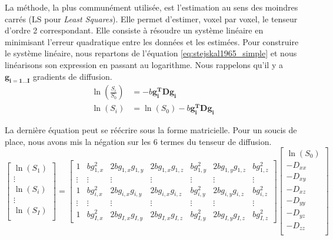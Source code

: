 La méthode, la plus communément utilisée, est l'estimation au sens des moindres carrés (LS pour \textit{Least Squares}).
Elle permet d'estimer, voxel par voxel, le tenseur d'ordre 2 correspondant.
Elle consiste à résoudre un système linéaire en minimisant l'erreur quadratique entre les données et les estimées.
Pour construire le système linéaire, nous repartons de l'équation \eqref{eq:stejskal1965_simple} 
et nous linéarisons son expression en passant au logarithme.
Nous rappelons qu'il y a $\mathbf{g_{i=1\dots I}}$ gradients de diffusion.
\begin{align}
    \ln \left(\frac{S_i}{S_0}\right) &= -b \mathbf{g_i^T}\mathbf{D}\mathbf{g_i} \nonumber \\
    \ln \left(S_i\right) &= \ln \left(S_0\right) - b \mathbf{g_i^T}\mathbf{D}\mathbf{g_i} \nonumber
\end{align}

La dernière équation peut se réécrire sous la forme matricielle.
Pour un soucis de place, nous avons mis la négation sur les 6 termes du tenseur de diffusion.
\begin{equation}
    \left[\begin{array}{c}
              \ln \left(S_1\right) \\
              \vdots \\
              \ln \left(S_i\right) \\
              \vdots \\
              \ln \left(S_I\right) \\
          \end{array}\right]  = \left[\begin{array}{ccccccc}
				      1 & bg_{1,x}^2 & 2bg_{1,x}g_{1,y} & 2bg_{1,x}g_{1,z} & bg_{1,y}^2 & 2bg_{1,y}g_{1,z} & bg_{1,z}^2\\
				      \vdots & \vdots & \vdots & \vdots & \vdots & \vdots & \vdots \\
                                     1 & b g_{i,x}^2 & 2bg_{i,x}g_{i,y} & 2bg_{i,x}g_{i,z} & bg_{i,y}^2 & 2bg_{i,y}g_{i,z} & bg_{i,z}^2 \\
                                     \vdots & \vdots & \vdots & \vdots & \vdots & \vdots & \vdots \\
                                     1 & b g_{I,x}^2 & 2bg_{I,x}g_{I,y} & 2bg_{I,x}g_{I,z} & bg_{I,y}^2 & 2bg_{I,y}g_{I,z} & bg_{I,z}^2 
                                 \end{array}\right] \left[\begin{array}{c}
							  \ln\left(S_0\right) \\
							  -D_{xx}\\
							  -D_{xy}\\
							  -D_{xz}\\
							  -D_{yy}\\
							  -D_{yz}\\
							  -D_{zz}\\
						      \end{array}\right]	\nonumber
\end{equation}

